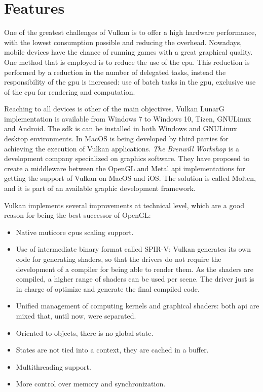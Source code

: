 \chapter{Features}
One of the greatest challenges of Vulkan is to offer a high hardware performance, with the lowest consumption possible
and reducing the overhead. Nowadays, mobile devices have the chance of running games with a great graphical quality.
One method that is employed is to reduce the use of the \gls{cpu}. This reduction is performed by a reduction in the
number of delegated tasks, instead the responsibility of the \gls{gpu} is increased: use of batch tasks in the
\gls{gpu}, exclusive use of the cpu for rendering and computation.

Reaching to all devices is other of the main objectives. Vulkan LunarG implementation is available from Windows 7 to
Windows 10, Tizen, GNU\/Linux and Android. The \gls{sdk} is can be installed in both Windows and GNU\/Linux desktop
environments. In MacOS is being developed by third parties for achieving the execution of Vulkan applications. \emph{The
Brenwill Workshop} is a development company specialized on graphics software. They have proposed to create a middleware
between the OpenGL and Metal \gls{api} implementations for getting the support of Vulkan on MacOS and iOS. The solution
is called Molten, and it is part of an available graphic development framework.

Vulkan implements several improvements at technical level, which are a good reason for being the best successor of
OpenGL:
\begin{itemize}
    \item Native muticore \gls{cpu}s scaling support.
    \item Use of intermediate binary format called SPIR-V: Vulkan generates its own code for generating shaders, so
    that the drivers do not require the development of a compiler for being able to render them. As the shaders are
    compiled, a higher range of shaders can be used per scene. The driver just is in charge of optimize and generate
    the final compiled code.
    \item Unified management of computing kernels and graphical shaders: both \gls{api} are mixed that, until now, were
    separated.
    \item Oriented to objects, there is no global state.
    \item States are not tied into a context, they are cached in a buffer.
    \item Multithreading support.
    \item More control over memory and synchronization.
\end{itemize}

